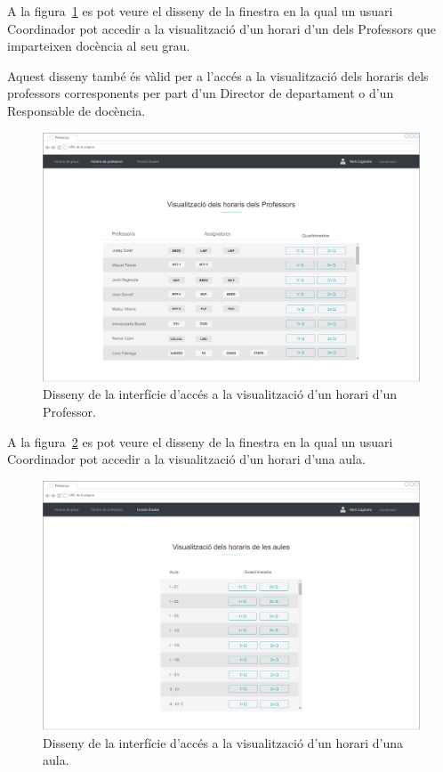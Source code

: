 \documentclass[a4paper,12pt]{ThesisStyle}
\begin{document}
A la figura~\ref{img:horaris_seleccioProfessor} es pot veure el disseny de la finestra en la qual un usuari Coordinador pot accedir a la visualització d'un horari d'un dels Professors que imparteixen docència al seu grau.

Aquest disseny també és vàlid per a l'accés a la visualització dels horaris dels professors corresponents per part d'un Director de departament o d'un Responsable de docència.

\begin{figure}[H]
	\centering
	\includegraphics[width=\textwidth]{assets/interfaces/horaris/seleccioProfessor.pdf}
	\caption{\label{img:horaris_seleccioProfessor}Disseny de la interfície d'accés a la visualització d'un horari d'un Professor.}
\end{figure}

A la figura~\ref{img:horaris_seleccioAula} es pot veure el disseny de la finestra en la qual un usuari Coordinador pot accedir a la visualització d'un horari d'una aula.

\begin{figure}[H]
	\centering
	\includegraphics[width=\textwidth]{assets/interfaces/horaris/seleccioAula.pdf}
	\caption{\label{img:horaris_seleccioAula}Disseny de la interfície d'accés a la visualització d'un horari d'una aula.}
\end{figure}
\end{document}
